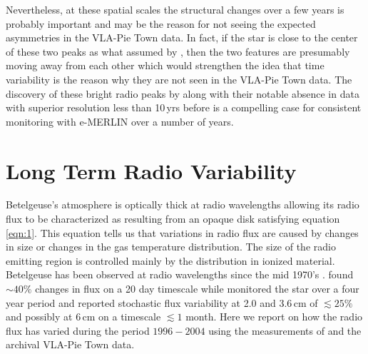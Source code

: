 Nevertheless, at these spatial scales the structural changes over a few years is probably important and may be the reason for not seeing the expected asymmetries in the VLA-Pie Town data. In fact, if the star is close to the center of these two peaks as what assumed by \cite{richards_2013}, then the two features are presumably moving away from each other which would strengthen the idea that time variability is the reason why they are not seen in the VLA-Pie Town data. The discovery of these bright radio peaks by \cite{richards_2013} along with their notable absence in data with superior resolution less than 10\,yrs before is a compelling case for consistent monitoring with e-MERLIN over a number of years.

\section{Long Term Radio Variability}\label{sec:5.14}
Betelgeuse's atmosphere is optically thick at radio wavelengths allowing its radio flux to be characterized as resulting from an opaque disk satisfying equation \ref{eqn:1}. This equation tells us that variations in radio flux are caused by changes in size or changes in the gas temperature distribution. The size of the radio emitting region is controlled mainly by the distribution in ionized material. Betelgeuse has been observed at radio wavelengths since the mid 1970's \cite[e.g.][]{newell_1982}. \cite{bookbinder_1987} found $\sim 40\%$ changes in flux on a 20 day timescale while \cite{drake_1992} monitored the star over a four year period and reported stochastic flux variability at 2.0 and 3.6\,cm of $\lesssim 25\%$ and possibly at 6\,cm on a timescale $\lesssim 1$ month. Here we report on how the radio flux has varied during the period $1996-2004$ using the measurements of \cite{lim_1998} and the archival VLA-Pie Town data.

